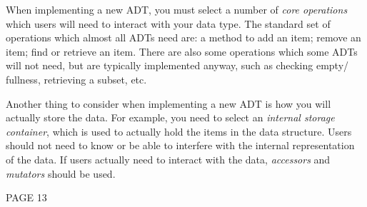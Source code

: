 When implementing a new ADT, you must select a number of \textit{core operations} which users will need to interact with
 your data type. The standard set of operations which almost all ADTs need are: a method to add an item; remove an item;
 find or retrieve an item. There are also some operations which some ADTs will not need, but are typically implemented
 anyway, such as checking empty/ fullness, retrieving a subset, etc.

Another thing to consider when implementing a new ADT is how you will actually store the data. For example, you need to
 select an \textit{internal storage container}, which is used to actually hold the items in the data structure. Users
 should not need to know or be able to interfere with the internal representation of the data. If users actually need to
 interact with the data, \textit{accessors} and \textit{mutators} should be used.

{PAGE 13}